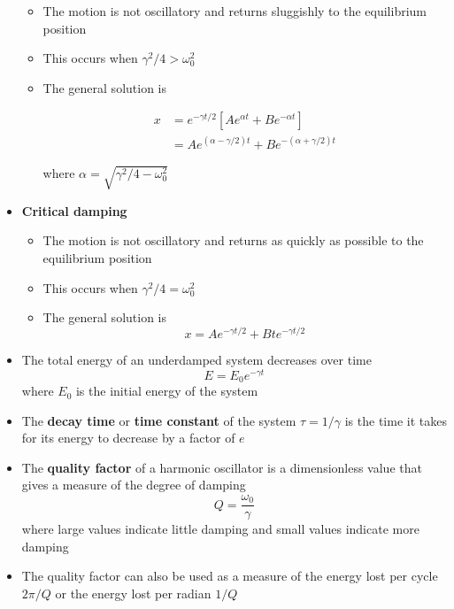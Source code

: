 \documentclass{article}
\begin{document}
\begin{itemize}
        \begin{itemize}
          \item The motion is not oscillatory and returns sluggishly to the equilibrium position

          \item This occurs when $\gamma^2 / 4 > \omega_0^2$

          \item The general solution is

                \begin{align*}
                  x & = e^{-\gamma t / 2} [A e^{\alpha t} + B e^{-\alpha t}]           \\
                    & = A e^{(\alpha - \gamma / 2) t} + B e^{-(\alpha + \gamma / 2) t}
                \end{align*}

                where $\alpha = \sqrt{\gamma^2 / 4 - \omega_0^2}$
        \end{itemize}

  \item \textbf{Critical damping}

        \begin{itemize}
          \item The motion is not oscillatory and returns as quickly as possible to the equilibrium position

          \item This occurs when $\gamma^2 / 4 = \omega_0^2$

          \item The general solution is \[x = A e^{-\gamma t / 2} + B t e^{-\gamma t / 2}\]
        \end{itemize}

  \item The total energy of an underdamped system decreases over time \[E = E_0 e^{-\gamma t}\] where $E_0$ is the initial energy of the system

  \item The \textbf{decay time} or \textbf{time constant} of the system $\tau = 1 / \gamma$ is the time it takes for its energy to decrease by a factor of $e$

  \item The \textbf{quality factor} of a harmonic oscillator is a dimensionless value that gives a measure of the degree of damping \[Q = \frac{\omega_0}{\gamma}\] where large values indicate little damping and small values indicate more damping

  \item The quality factor can also be used as a measure of the energy lost per cycle $2 \pi / Q$ or the energy lost per radian $1 / Q$
\end{itemize}
\end{document}
